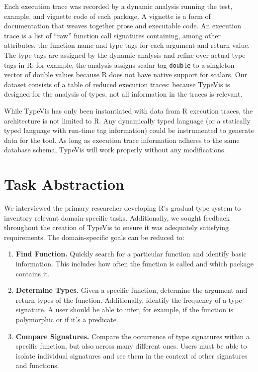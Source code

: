 \documentclass{vgtc}                          %
\newcommand{\code}[1]{\texttt{\small{#1}}}
\newcommand{\typevis}{{\sc TypeVis}\xspace}
\begin{document}
Each execution trace was recorded by a dynamic analysis
running the test, example, and vignette code of each package.
A vignette is a form of documentation that weaves
together prose and executable code.
An execution trace is a list of ``raw'' function call signatures
containing, among other attributes, the function name
and type tags for each argument and return value.
The type tags are assigned by the dynamic analysis and
refine over actual type tags in R; for example, the analysis
assigns scalar tag \code{double} to a singleton vector of double values
because R does not have native support for scalars.
Our dataset consists of a table of reduced execution traces:
because \typevis is designed for the analysis of types, not all information
in the traces is relevant.

While \typevis has only been instantiated with
data from R execution traces, the architecture is not
limited to R.
Any dynamically typed language %
(or a statically typed language with run-time tag information)
could be instrumented to generate data for the tool.
As long as execution trace information adheres to
the same database schema, \typevis will
work properly without any modifications.


\section{Task Abstraction}

We interviewed the primary researcher developing R's gradual type system
to inventory relevant domain-specific tasks.
Additionally, we sought feedback throughout the creation of \typevis
to ensure it was adequately satisfying requirements.
The domain-specific goals can be reduced to:

\begin{enumerate}
\item {\bf Find Function.} Quickly search for a particular function and identify basic information. This includes how often the function is called and which package contains it.
\item {\bf Determine Types.} Given a specific function, determine the argument and return types of the function. Additionally, identify the frequency of a type signature. A user should be able to infer, for example, if the function is polymorphic or if it's a predicate.
\item {\bf Compare Signatures.} Compare the occurrence of type signatures within a specific function, but also across many different ones. Users must be able to isolate individual signatures and see them in the context of other signatures and functions.
\end{enumerate}
\end{document}
